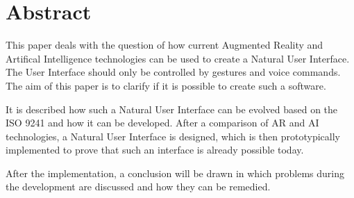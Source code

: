 \section{Abstract}
This paper deals with the question of how current Augmented Reality and Artifical Intelligence technologies can be used to create a Natural User Interface. The User Interface should only be controlled by gestures and voice commands. The aim of this paper is to clarify if it is possible to create such a software.

It is described how such a Natural User Interface can be evolved based on the ISO 9241 and how it can be developed.
After a comparison of AR and AI technologies, a Natural User Interface is designed, which is then prototypically implemented to prove that such an interface is already possible today.

After the implementation, a conclusion will be drawn in which problems during the development are discussed and how they can be remedied.